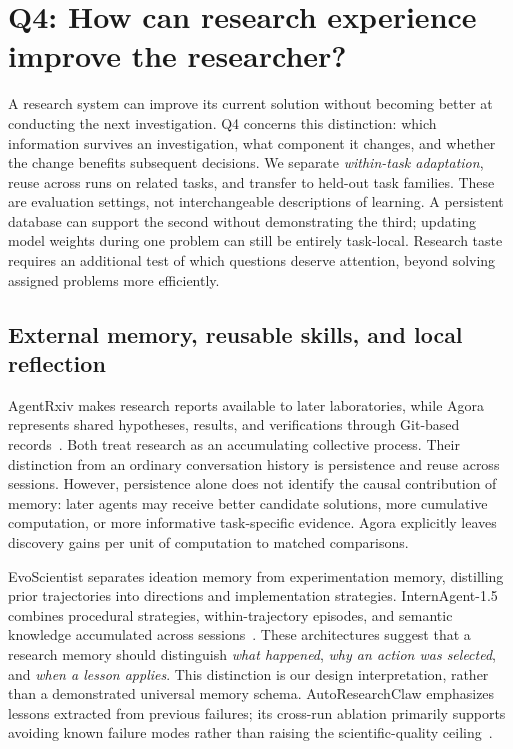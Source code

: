 \section{Q4: How can research experience improve the researcher?}
\label{sec:learning}

A research system can improve its current solution without becoming better at conducting the next investigation. Q4 concerns this distinction: which information survives an investigation, what component it changes, and whether the change benefits subsequent decisions. We separate \emph{within-task adaptation}, reuse across runs on related tasks, and transfer to held-out task families. These are evaluation settings, not interchangeable descriptions of learning. A persistent database can support the second without demonstrating the third; updating model weights during one problem can still be entirely task-local. Research taste requires an additional test of which questions deserve attention, beyond solving assigned problems more efficiently.

\subsection{External memory, reusable skills, and local reflection}

AgentRxiv makes research reports available to later laboratories, while Agora represents shared hypotheses, results, and verifications through Git-based records~\cite{agentrxiv,agora}. Both treat research as an accumulating collective process. Their distinction from an ordinary conversation history is persistence and reuse across sessions. However, persistence alone does not identify the causal contribution of memory: later agents may receive better candidate solutions, more cumulative computation, or more informative task-specific evidence. Agora explicitly leaves discovery gains per unit of computation to matched comparisons.

EvoScientist separates ideation memory from experimentation memory, distilling prior trajectories into directions and implementation strategies. InternAgent-1.5 combines procedural strategies, within-trajectory episodes, and semantic knowledge accumulated across sessions~\cite{evoscientist,internagent-1-5}. These architectures suggest that a research memory should distinguish \emph{what happened}, \emph{why an action was selected}, and \emph{when a lesson applies}. This distinction is our design interpretation, rather than a demonstrated universal memory schema. AutoResearchClaw emphasizes lessons extracted from previous failures; its cross-run ablation primarily supports avoiding known failure modes rather than raising the scientific-quality ceiling~\cite{autoresearchclaw}.

